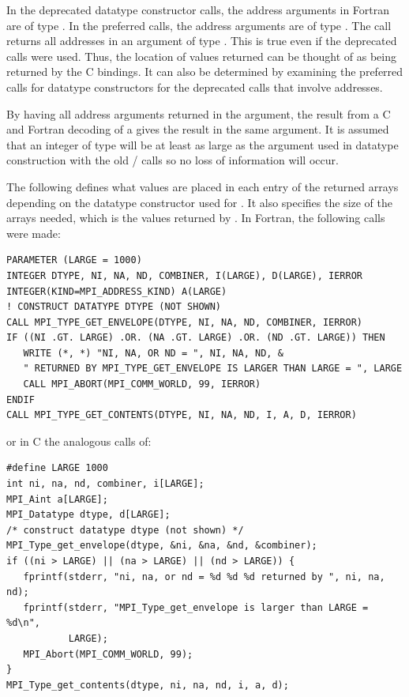 In the
deprecated
 datatype constructor calls, the address arguments in Fortran are of
type .  In the
preferred
calls, the address arguments are of
type .  The call
 returns all addresses in an argument
of type .  This is true even if the
deprecated
 calls were used.  Thus, the location of values returned can
be thought of as being returned by the C bindings.  It can also be
determined by examining the
preferred
 calls for datatype constructors
for the
deprecated
calls that involve addresses.

\begin{rationale}
By having all address arguments returned in the
 argument, the result from a C and Fortran
decoding of a  gives the result in the same
argument.  It is assumed that an integer
of type  will be at least as large as
the  argument used in datatype construction with the old \mpii/
calls so no loss of information will occur.
\end{rationale}

The following defines what values are placed in each entry of the
returned arrays depending on the datatype constructor used for
.  It also specifies the size of the arrays needed,
which is the values returned by .
In Fortran, the following calls were made:

\begin{lstlisting}[language={[MPI]Fortran}]
PARAMETER (LARGE = 1000)
INTEGER DTYPE, NI, NA, ND, COMBINER, I(LARGE), D(LARGE), IERROR
INTEGER(KIND=MPI_ADDRESS_KIND) A(LARGE)
! CONSTRUCT DATATYPE DTYPE (NOT SHOWN)
CALL MPI_TYPE_GET_ENVELOPE(DTYPE, NI, NA, ND, COMBINER, IERROR)
IF ((NI .GT. LARGE) .OR. (NA .GT. LARGE) .OR. (ND .GT. LARGE)) THEN
   WRITE (*, *) "NI, NA, OR ND = ", NI, NA, ND, &
   " RETURNED BY MPI_TYPE_GET_ENVELOPE IS LARGER THAN LARGE = ", LARGE
   CALL MPI_ABORT(MPI_COMM_WORLD, 99, IERROR)
ENDIF
CALL MPI_TYPE_GET_CONTENTS(DTYPE, NI, NA, ND, I, A, D, IERROR)
\end{lstlisting}

\noindent
or in C the analogous calls of:

\begin{lstlisting}[language={[MPI]C}]
#define LARGE 1000
int ni, na, nd, combiner, i[LARGE];
MPI_Aint a[LARGE];
MPI_Datatype dtype, d[LARGE];
/* construct datatype dtype (not shown) */
MPI_Type_get_envelope(dtype, &ni, &na, &nd, &combiner);
if ((ni > LARGE) || (na > LARGE) || (nd > LARGE)) {
   fprintf(stderr, "ni, na, or nd = %d %d %d returned by ", ni, na, nd);
   fprintf(stderr, "MPI_Type_get_envelope is larger than LARGE = %d\n",
           LARGE);
   MPI_Abort(MPI_COMM_WORLD, 99);
}
MPI_Type_get_contents(dtype, ni, na, nd, i, a, d);
\end{lstlisting}

